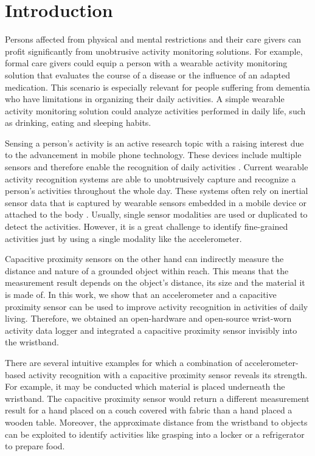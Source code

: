 \documentclass[runningheads,a4paper]{llncs}
\begin{document}
\section{Introduction}

Persons affected from physical and mental restrictions and their care givers can profit significantly from unobtrusive activity monitoring solutions. For example, formal care givers could equip a person with a wearable activity monitoring solution that evaluates the course of a disease or the influence of an adapted medication. This scenario is especially relevant for people suffering from dementia who have limitations in organizing their daily activities. A simple wearable activity monitoring solution could analyze activities performed in daily life, such as drinking, eating and sleeping habits. 

Sensing a person's activity is an active research topic with a raising interest due to the advancement in mobile phone technology. These devices include multiple sensors and therefore enable the recognition of daily activities \cite{brezmes2009activity}. Current wearable activity recognition systems are able to unobtrusively capture and recognize a person's activities throughout the whole day. These systems often rely on inertial sensor data that is captured by wearable sensors embedded in a mobile device \cite{brezmes2009activity} or attached to the body \cite{Ravi2005}. Usually, single sensor modalities are used or duplicated to detect the activities. However, it is a great challenge to identify fine-grained activities just by using a single modality like the accelerometer.

Capacitive proximity sensors on the other hand can indirectly measure the distance and nature of a grounded object within reach. This means that the measurement result depends on the object's distance, its size and the material it is made of. In this work, we show that an accelerometer and a capacitive proximity sensor can be used to improve activity recognition in activities of daily living. Therefore, we obtained an open-hardware and open-source wrist-worn activity data logger \cite{hedgehog} and integrated a capacitive proximity sensor invisibly into the wristband. 

There are several intuitive examples for which a combination of accelerometer-based activity recognition with a capacitive proximity sensor reveals its strength. For example, it may be conducted which material is placed underneath the wristband. The capacitive proximity sensor would return a different measurement result for a hand placed on a couch covered with fabric than a hand placed a wooden table. Moreover, the approximate distance from the wristband to objects can be exploited to identify activities like grasping into a locker or a refrigerator to prepare food.
\end{document}
